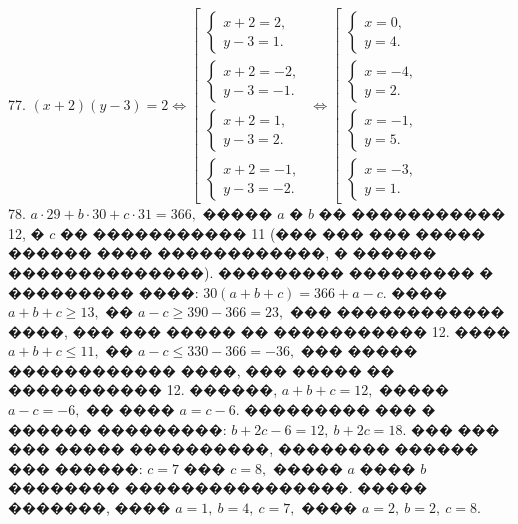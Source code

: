 \documentclass[12pt]{article}
\begin{document}
77. $(x+2)(y-3)=2\Leftrightarrow \left[\begin{array}{l}\begin{cases}x+2=2,\\ y-3=1.\end{cases}\\ \begin{cases}x+2=-2,\\ y-3=-1.\end{cases}\\
\begin{cases}x+2=1,\\ y-3=2.\end{cases}\\ \begin{cases}x+2=-1,\\ y-3=-2.\end{cases}\end{array}\right.\Leftrightarrow
\left[\begin{array}{l}\begin{cases}x=0,\\ y=4.\end{cases}\\ \begin{cases} x=-4,\\ y=2.\end{cases}\\
\begin{cases}x=-1,\\ y=5.\end{cases}\\ \begin{cases}x=-3,\\ y=1.\end{cases}\end{array}\right.$\\
78. $a\cdot29+b\cdot30+c\cdot31=366,$ ����� $a$ � $b$ �� ����������� 12, � $c$ �� ����������� 11 (��� ��� ��� ����� ������ ���� ������������, � ������ ��������������). ��������� ��������� � ��������� ����: $30(a+b+c)=366+a-c.$ ���� $a+b+c\geqslant 13,$ �� $a-c\geqslant390-366=23,$ ��� ������������ ����, ��� ��� ����� �� ����������� 12. ���� $a+b+c\leqslant 11,$ �� $a-c\leqslant 330-366=-36,$ ��� ����� ������������ ����, ��� ����� �� ����������� 12. ������, $a+b+c=12,$ ����� $a-c=-6,$ �� ���� $a=c-6.$ ��������� ��� � ������ ���������: $b+2c-6=12,\ b+2c=18.$ ��� ��� ��� ����� ����������, �������� ������ ��� ������: $c=7$ ��� $c=8,$ ����� $a$ ���� $b$ �������� ����������������. ����� �������, ���� $a=1,\ b=4,\ c=7,$ ���� $a=2,\ b=2,\ c=8.$\\
\end{document}
